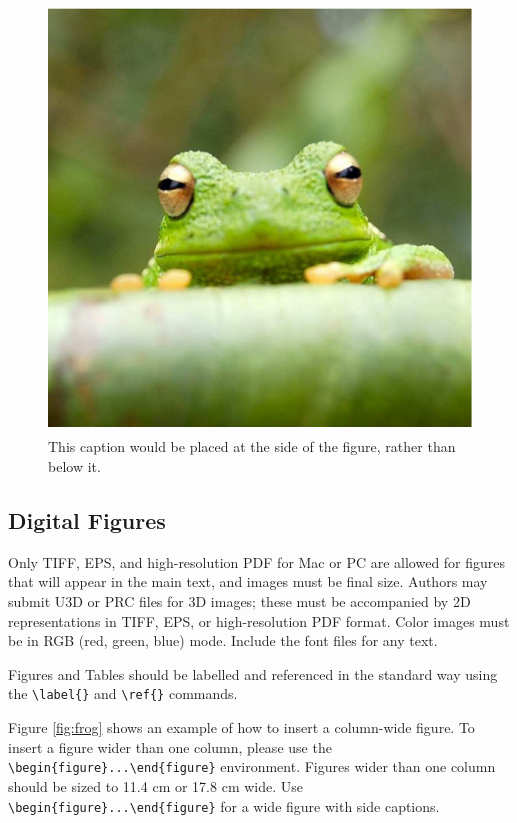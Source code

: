\documentclass[9pt,twocolumn,twoside]{pnas-new}
\begin{document}
\begin{figure}
\centering
\includegraphics[width=11.4cm,height=11.4cm]{figures/frog}
\caption{This caption would be placed at the side of the figure, rather than below it.}\label{fig:side}
\end{figure}

\subsection*{Digital Figures}
\label{sec:figures}

Only TIFF, EPS, and high-resolution PDF for Mac or PC are allowed for figures that will appear in the main text, and images must be final size. Authors may submit U3D or PRC files for 3D images; these must be accompanied by 2D representations in TIFF, EPS, or high-resolution PDF format.  Color images must be in RGB (red, green, blue) mode. Include the font files for any text. 

Figures and Tables should be labelled and referenced in the standard way using the \verb|\label{}| and \verb|\ref{}| commands.

Figure \ref{fig:frog} shows an example of how to insert a column-wide figure. To insert a figure wider than one column, please use the \verb|\begin{figure}...\end{figure}| environment. Figures wider than one column should be sized to 11.4 cm or 17.8 cm wide. Use \verb|\begin{figure}...\end{figure}| for a wide figure with side captions.
\end{document}
